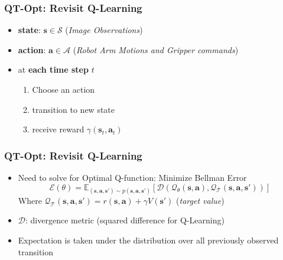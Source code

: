 \documentclass{beamer}
\renewcommand{\vec}[1]{\mathbf{#1}}
\newcommand{\forthSec}{QT-Opt}
\begin{document}
    \begin{frame}
      \frametitle{\forthSec: Revisit Q-Learning}
      \begin{itemize}
        \item \textbf{state}: $\vec{s} \in \mathcal{S}$ (\textit{Image Observations})
        \item \textbf{action}: $\vec{a} \in \mathcal{A}$ (\textit{Robot Arm Motions and Gripper commands})
        \item at \textbf{each time step} $t$
        \begin{enumerate}
          \item Choose an action
          \item transition to new state
          \item receive reward $\gamma(\vec{s}_t, \vec{a}_t)$
        \end{enumerate}
      \end{itemize}
    \end{frame}

    \begin{frame}
      \frametitle{\forthSec: Revisit Q-Learning}
      \begin{itemize}
        \item Need to solve for Optimal Q-function: Minimize Bellman Error \\
              \begin{equation*}
                \mathcal{E}(\theta) = \mathbb{E}_{(\vec{s}, \vec{a}, \vec{s'}) \sim p(\vec{s}, \vec{a}, \vec{s'})}[\mathcal{D}(\mathcal{Q}_{\theta}(\vec{s}, \vec{a}),\mathcal{Q}_{\mathcal{T}}(\vec{s}, \vec{a}, \vec{s'}))]
              \end{equation*}
              Where $\mathcal{Q}_{\mathcal{T}}(\vec{s}, \vec{a}, \vec{s'}) = r(\vec{s}, \vec{a}) + \gamma V(\vec{s'})$ (\textit{target value})
        \item $\mathcal{D}$: divergence metric (squared difference for Q-Learning)
        \linebreak
        \item Expectation is taken under the distribution over all previously observed transition
      \end{itemize}
    \end{frame}
\end{document}
